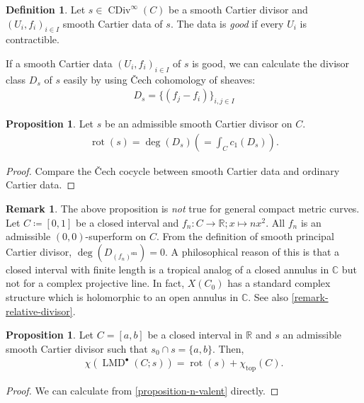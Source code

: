 \documentclass[a4paper,dvipdfmx,reqno,12pt]{amsart}
\theoremstyle{definition}
\newtheorem{definition}[theorem]{Definition}
\newtheorem{proposition}[theorem]{Proposition}
\newtheorem{remark}[theorem]{Remark}
\newcommand{\deq}{\coloneqq}
\newcommand{\opn}[1]{\operatorname{#1}}
\numberwithin{equation}{section}
\begin{document}
\begin{definition}
Let $s\in \opn{CDiv}^{\infty}(C)$ be a smooth Cartier
divisor and $(U_i,f_i)_{i\in I}$ smooth Cartier data
of $s$. The data is \emph{good} if 
every $U_i$ is contractible.
\end{definition}
If a smooth Cartier data $(U_i,f_i)_{i\in I}$ of $s$ 
is good,
we can calculate the divisor class $D_s$ of $s$ easily
by using \v{C}ech cohomology of sheaves:
\begin{align}
D_s=\{(f_j-f_i)\}_{i,j\in I}
\end{align}

\begin{proposition}
Let $s$ be an admissible smooth Cartier divisor on $C$.
\label{equation-rotation-number}
\begin{align}
\opn{rot}(s)=\opn{deg}(D_s)(=\int_{C} c_1(D_s)).
\end{align}
\end{proposition}

\begin{proof}
Compare the \v{C}ech cocycle between smooth Cartier data and ordinary Cartier data.
\end{proof}

\begin{remark}
\label{remark-rotation-closed-interval} 
The above proposition 
is \emph{not} true for general compact metric curves.
Let $C\deq [0,1]$ be a closed interval
and $f_n\colon C\to \mathbb{R};x \mapsto nx^{2}$.
All $f_n$ is an admissible $(0,0)$-superform on $C$.
From the definition of smooth principal Cartier divisor,
$\opn{deg}(D_{(f_n)^{\mathrm{sm}}})=0$. 
A philosophical reason of this is that
a closed interval with finite length is a tropical
analog of a closed annulus in $\mathbb{C}$ but not for
a complex projective line. In fact, $X(C_0)$ 
has a standard complex structure which is holomorphic to
an open annulus in $\mathbb{C}$.
See also \cref{remark-relative-divisor}.
\end{remark}

\begin{proposition}
\label{proposition-simple-interval-rr}
Let $C=[a,b]$ be a closed interval in $\mathbb{R}$
and $s$ an admissible smooth Cartier divisor 
such that $s_0\cap s=\{a,b\}$. Then,
\begin{align}
\chi(\opn{LMD}^{\bullet}(C;s))=\opn{rot}(s)+
\chi_{\opn{top}}(C).
\end{align}
\end{proposition}
\begin{proof}
We can calculate from 
\cref{proposition-n-valent} directly.
\end{proof}
\end{document}
